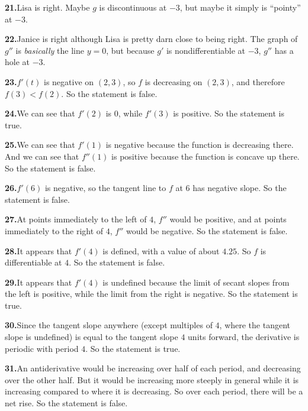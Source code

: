 \documentclass[10pt,oneside,]{book}
\newcommand{\lt}{<}
\theoremstyle{plain}
\theoremstyle{definition}
\numberwithin{equation}{section}
\newcommand{\fe}[2]{#1\mathopen{}\left(#2\right)\mathclose{}}
\newcommand{\ointerval}[2]{\left(#1,#2\right)}
\newcommand{\fd}[1]{#1'}
\newcommand{\sd}[1]{#1''}
\begin{document}
\par\smallskip
\noindent\textbf{21.}\quad{}Lisa is right.  Maybe \(g\) is discontinuous at \(-3\), but maybe it simply is ``pointy'' at \(-3\).%
\par\smallskip
\noindent\textbf{22.}\quad{}Janice is right although Lisa is pretty darn close to being right. The graph of \(\sd{g}\) is \emph{basically} the line \(y=0\), but because \(\fd{g}\) is nondifferentiable at \(-3\), \(\sd{g}\) has a hole at \(-3\).%
\par\smallskip
\noindent\textbf{23.}\quad{}\(\fe{\fd{f}}{t}\) is negative on \(\ointerval{2}{3}\), so \(f\) is decreasing on \(\ointerval{2}{3}\), and therefore \(\fe{f}{3}\lt\fe{f}{2}\). So the statement is false.%
\par\smallskip
\noindent\textbf{24.}\quad{}We can see that \(\fe{\fd{f}}{2}\) is \(0\), while \(\fe{\fd{f}}{3}\) is positive. So the statement is true.%
\par\smallskip
\noindent\textbf{25.}\quad{}We can see that \(\fe{\fd{f}}{1}\) is negative because the function is decreasing there. And we can see that \(\fe{\sd{f}}{1}\) is positive because the function is concave up there. So the statement is false.%
\par\smallskip
\noindent\textbf{26.}\quad{}\(\fe{\fd{f}}{6}\) is negative, so the tangent line to \(f\) at \(6\) has negative slope. So the statement is false.%
\par\smallskip
\noindent\textbf{27.}\quad{}At points immediately to the left of \(4\), \(\sd{f}\) would be positive, and at points immediately to the right of \(4\), \(\sd{f}\) would be negative. So the statement is false.%
\par\smallskip
\noindent\textbf{28.}\quad{}It appears that \(\fe{\fd{f}}{4}\) is defined, with a value of about \(4.25\). So \(f\) is differentiable at \(4\). So the statement is false.%
\par\smallskip
\noindent\textbf{29.}\quad{}It appears that \(\fe{\fd{f}}{4}\) is undefined because the limit of secant slopes from the left is positive, while the limit from the right is negative. So the statement is true.%
\par\smallskip
\noindent\textbf{30.}\quad{}Since the tangent slope anywhere (except multiples of \(4\), where the tangent slope is undefined) is equal to the tangent slope \(4\) units forward, the derivative is periodic with period \(4\). So the statement is true.%
\par\smallskip
\noindent\textbf{31.}\quad{}An antiderivative would be increasing over half of each period, and decreasing over the other half. But it would be increasing more steeply in general while it is increasing compared to where it is decreasing. So over each period, there will be a net rise. So the statement is false.%
\end{document}

